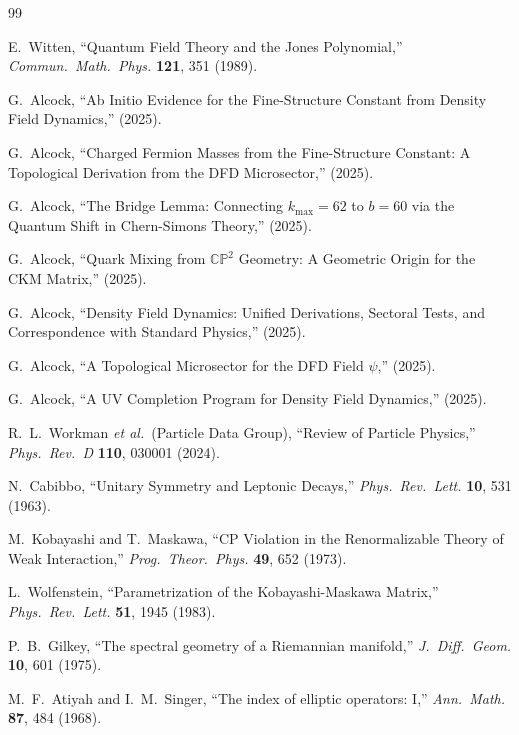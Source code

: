 \documentclass[11pt,a4paper]{article}
\newcommand{\CP}{\mathbb{CP}}
\begin{document}
\begin{thebibliography}{99}

 E.~Witten, ``Quantum Field Theory and the Jones Polynomial,'' \textit{Commun.\ Math.\ Phys.} \textbf{121}, 351 (1989).

 G.~Alcock, ``Ab Initio Evidence for the Fine-Structure Constant from Density Field Dynamics,'' (2025).

 G.~Alcock, ``Charged Fermion Masses from the Fine-Structure Constant: A Topological Derivation from the DFD Microsector,'' (2025).

 G.~Alcock, ``The Bridge Lemma: Connecting $k_{\max} = 62$ to $b = 60$ via the Quantum Shift in Chern-Simons Theory,'' (2025).

 G.~Alcock, ``Quark Mixing from $\CP^2$ Geometry: A Geometric Origin for the CKM Matrix,'' (2025).

 G.~Alcock, ``Density Field Dynamics: Unified Derivations, Sectoral Tests, and Correspondence with Standard Physics,'' (2025).

 G.~Alcock, ``A Topological Microsector for the DFD Field $\psi$,'' (2025).

 G.~Alcock, ``A UV Completion Program for Density Field Dynamics,'' (2025).

 R.~L.~Workman \textit{et al.}\ (Particle Data Group), ``Review of Particle Physics,'' \textit{Phys.\ Rev.\ D} \textbf{110}, 030001 (2024).

 N.~Cabibbo, ``Unitary Symmetry and Leptonic Decays,'' \textit{Phys.\ Rev.\ Lett.} \textbf{10}, 531 (1963).

 M.~Kobayashi and T.~Maskawa, ``CP Violation in the Renormalizable Theory of Weak Interaction,'' \textit{Prog.\ Theor.\ Phys.} \textbf{49}, 652 (1973).

 L.~Wolfenstein, ``Parametrization of the Kobayashi-Maskawa Matrix,'' \textit{Phys.\ Rev.\ Lett.} \textbf{51}, 1945 (1983).

 P.~B.~Gilkey, ``The spectral geometry of a Riemannian manifold,'' \textit{J.\ Diff.\ Geom.} \textbf{10}, 601 (1975).

 M.~F.~Atiyah and I.~M.~Singer, ``The index of elliptic operators: I,'' \textit{Ann.\ Math.} \textbf{87}, 484 (1968).

\end{thebibliography}
\end{document}

